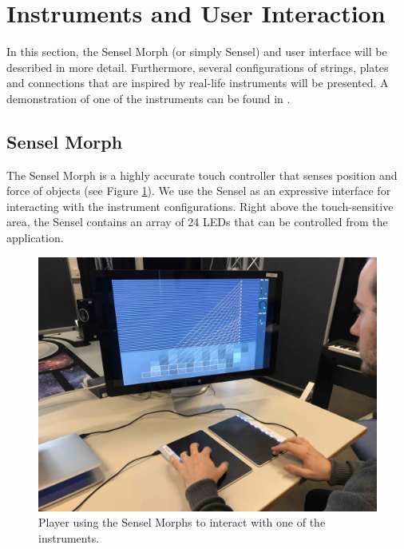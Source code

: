 \documentclass{article}
\begin{document}
\section{Instruments and User Interaction}\label{sec:instruments}
In this section, the Sensel Morph (or simply Sensel) and user interface will be described in more detail. Furthermore, several configurations of strings, plates and connections that are inspired by real-life instruments will be presented. A demonstration of one of the instruments can be found in \cite{video}.

\subsection{Sensel Morph}
The Sensel Morph is a highly accurate touch controller that senses position and force of objects \cite{sensel2018} (see Figure \ref{fig:sensel}). We use the Sensel as an expressive interface for interacting with the instrument configurations. Right above the touch-sensitive area, the Sensel contains an array of 24 LEDs that can be controlled from the application.
\begin{figure}[h]\includegraphics[width=1.0\columnwidth]{senselLQ.jpg}\centering
\caption{Player using the Sensel Morphs to interact with one of the instruments.\label{fig:sensel}}
\end{figure}
\end{document}
